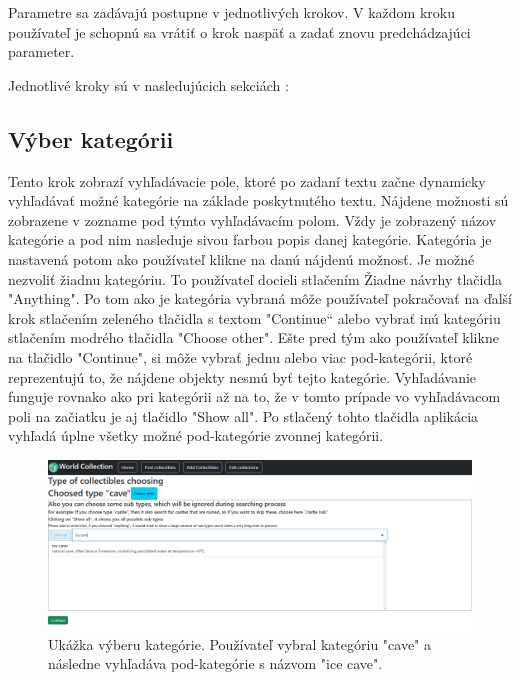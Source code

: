 Parametre sa zadávajú postupne v jednotlivých krokov. V každom kroku  používateľ je schopnú sa vrátiť o krok naspäť a zadať znovu predchádzajúci parameter.

Jednotlivé kroky sú v nasledujúcich sekciách :

\subsection*{Výber kategórii}
Tento krok zobrazí vyhľadávacie pole, ktoré po zadaní textu začne dynamicky vyhľadávať možné kategórie na základe poskytnutého textu. Nájdene možnosti sú zobrazene v zozname pod týmto vyhľadávacím polom. Vždy je zobrazený názov kategórie a pod nim nasleduje sivou farbou popis danej kategórie.
Kategória je nastavená potom ako používateľ klikne na danú nájdenú možnosť. Je možné nezvoliť žiadnu kategóriu. To používateľ docieli stlačením Žiadne návrhy tlačidla "Anything". Po tom ako je kategória vybraná môže používateľ pokračovať na ďalší krok stlačením zeleného tlačidla s textom "Continue“ alebo
vybrať inú kategóriu stlačením modrého tlačidla "Choose other". Ešte pred tým ako používateľ klikne na tlačidlo "Continue", si môže vybrať jednu alebo viac pod-kategórii, ktoré reprezentujú to, že nájdene objekty nesmú byť tejto kategórie.
Vyhľadávanie funguje rovnako ako pri kategórii až na to, že v tomto prípade vo vyhľadávacom poli na začiatku je aj tlačidlo "Show all". Po stlačený tohto tlačidla aplikácia vyhľadá úplne všetky možné pod-kategórie zvonnej kategórii.
\begin{figure}[h]
      \includegraphics[width=140mm]{../img/ud-kategoria.png}
      \centering
      \caption{Ukážka výberu kategórie. Používateľ vybral kategóriu "cave" a následne vyhľadáva pod-kategórie s názvom "ice cave". }
\end{figure}

